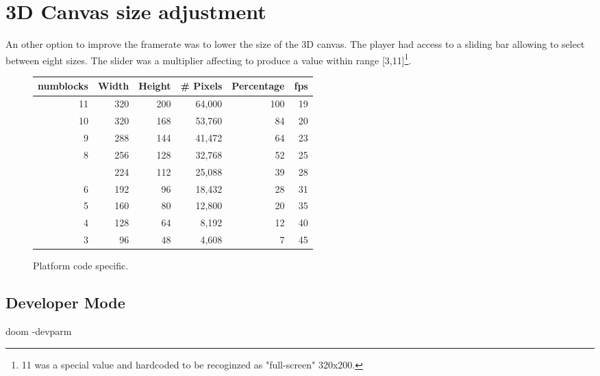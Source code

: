 \section{3D Canvas size adjustment}
An other option to improve the framerate was to lower the size of the 3D canvas. The player had access to a sliding bar allowing to select between eight sizes. The slider was a multiplier affecting  to produce a value within range [3,11]\footnote{11 was a special value and hardcoded to be recoginzed as "full-screen" 320x200.}.\\
\par
{}
\par
\par
{}
\par

\begin{figure}[H]
\centering  
\begin{tabularx}{\textwidth}{ R{1}  R{1} R{1} R{1}  R{1.4}  R{0.6} }
  \toprule
  \textbf{numblocks} & \textbf{Width} & \textbf{Height} & \textbf{\# Pixels} & \textbf{Percentage} & \textbf{fps}\\
  \toprule 

11 & 320 & 200 & 64,000 & 100 & 19 \\
10 & 320 & 168 & 53,760 &  84 & 20 \\
 9 & 288 & 144 & 41,472 &  64 & 23 \\
 8 & 256 & 128 & 32,768 &  52 & 25 \\
 \protect{} & 224 & 112 & 25,088 &  39 & 28 \\
 6 & 192 & 96 & 18,432 &  28 & 31  \\
 5 & 160 & 80 & 12,800 &  20 & 35  \\
 4 & 128 & 64 &  8,192 &  12 & 40  \\
 3 &  96 & 48 &  4,608 &   7 & 45  \\
   \toprule
\end{tabularx}
\caption{Platform code specific.}
\end{figure}

\par





\subsection{Developer Mode}
doom -devparm
\par

